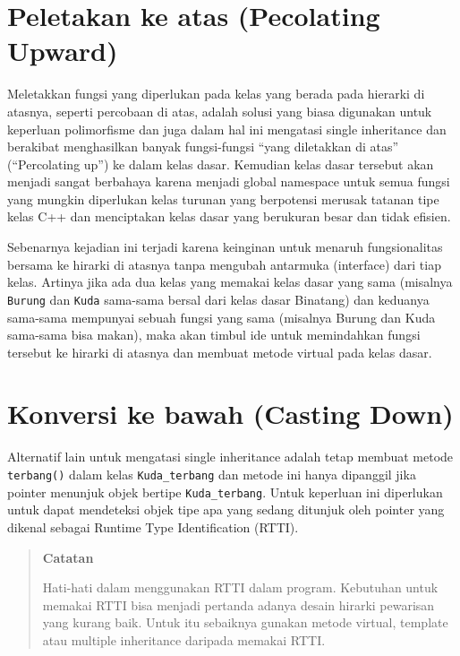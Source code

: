\section{Peletakan ke atas (Pecolating
Upward)}\label{peletakan-ke-atas-pecolating-upward}

Meletakkan fungsi yang diperlukan pada kelas yang berada pada hierarki
di atasnya, seperti percobaan di atas, adalah solusi yang biasa
digunakan untuk keperluan polimorfisme dan juga dalam hal ini mengatasi
single inheritance dan berakibat menghasilkan banyak fungsi-fungsi
``yang diletakkan di atas'' (``Percolating up'') ke dalam kelas dasar.
Kemudian kelas dasar tersebut akan menjadi sangat berbahaya karena
menjadi global namespace untuk semua fungsi yang mungkin diperlukan
kelas turunan yang berpotensi merusak tatanan tipe kelas C++ dan
menciptakan kelas dasar yang berukuran besar dan tidak efisien.

Sebenarnya kejadian ini terjadi karena keinginan untuk menaruh
fungsionalitas bersama ke hirarki di atasnya tanpa mengubah antarmuka
(interface) dari tiap kelas. Artinya jika ada dua kelas yang memakai
kelas dasar yang sama (misalnya \texttt{Burung} dan \texttt{Kuda}
sama-sama bersal dari kelas dasar Binatang) dan keduanya sama-sama
mempunyai sebuah fungsi yang sama (misalnya Burung dan Kuda sama-sama
bisa makan), maka akan timbul ide untuk memindahkan fungsi tersebut ke
hirarki di atasnya dan membuat metode virtual pada kelas dasar.

\section{Konversi ke bawah (Casting
Down)}\label{konversi-ke-bawah-casting-down}

Alternatif lain untuk mengatasi single inheritance adalah tetap membuat
metode \texttt{terbang()} dalam kelas \texttt{Kuda\_terbang} dan metode
ini hanya dipanggil jika pointer menunjuk objek bertipe
\texttt{Kuda\_terbang}. Untuk keperluan ini diperlukan untuk dapat
mendeteksi objek tipe apa yang sedang ditunjuk oleh pointer yang dikenal
sebagai Runtime Type Identification (RTTI).
\begin{quotation}
 {\LARGE {}} \textbf{Catatan}

 Hati-hati dalam menggunakan RTTI dalam program. Kebutuhan untuk memakai
 RTTI bisa menjadi pertanda adanya desain hirarki pewarisan yang kurang
 baik. Untuk itu sebaiknya gunakan metode virtual, template atau multiple
 inheritance daripada memakai RTTI.
\end{quotation}


